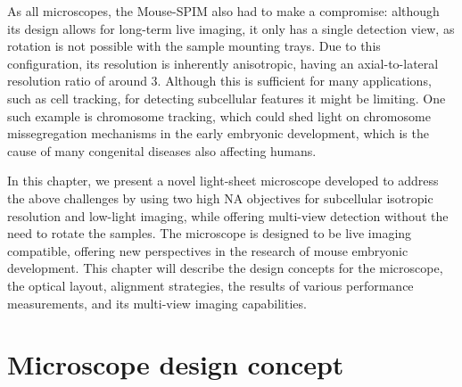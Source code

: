 As all microscopes, the Mouse-SPIM also had to make a compromise: although its design allows for long-term live imaging, it only has a single detection view, as rotation is not possible with the sample mounting trays. Due to this configuration, its resolution is inherently anisotropic, having an axial-to-lateral resolution ratio of around 3. Although this is sufficient for many applications, such as cell tracking, for detecting subcellular features it might be limiting. One such example is chromosome tracking, which could shed light on chromosome missegregation mechanisms in the early embryonic development, which is the cause of many congenital diseases also affecting humans.

In this chapter, we present a novel light-sheet microscope developed to address the above challenges by using two high NA objectives for subcellular isotropic resolution and low-light imaging, while offering multi-view detection without the need to rotate the samples. The microscope is designed to be live imaging compatible, offering new perspectives in the research of mouse embryonic development. This chapter will describe the design concepts for the microscope, the optical layout, alignment strategies, the results of various performance measurements, and its multi-view imaging capabilities. 


\section{Microscope design concept}
\label{sec:120concept}

